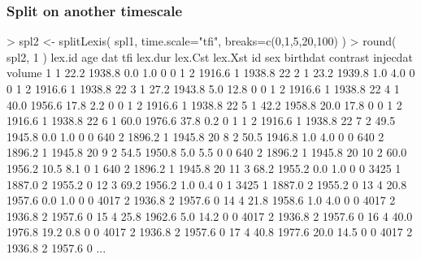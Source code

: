 \begin{frame}[fragile]
  \frametitle{Split on another timescale}
\vspace*{-1em}
\footnotesize
\renewcommand{\baselinestretch}{0.9}
\begin{semiverbatim}
> spl2 <- splitLexis( spl1, time.scale="tfi", breaks=c(0,1,5,20,100) )
> round( spl2, 1 )
   lex.id  age    dat  tfi lex.dur lex.Cst lex.Xst   id sex birthdat contrast injecdat volume
\alert<2>{1       1 22.2 1938.8  0.0     1.0       0       0    1   2   1916.6        1   1938.8     22}
\alert<2,4>{2       1 23.2 1939.8  1.0     4.0       0       0    1   2   1916.6        1   1938.8     22}
\alert<2,4>{3       1 27.2 1943.8  5.0    12.8       0       0    1   2   1916.6        1   1938.8     22}
\alert<2,3>{4       1 40.0 1956.6 17.8     2.2       0       0    1   2   1916.6        1   1938.8     22}
\alert<2,4>{5       1 42.2 1958.8 20.0    17.8       0       0    1   2   1916.6        1   1938.8     22}
\alert<2,3>{6       1 60.0 1976.6 37.8     0.2       0       1    1   2   1916.6        1   1938.8     22}
\alert<5>{7       2 49.5 1945.8  0.0     1.0       0       0  640   2   1896.2        1   1945.8     20}
\alert<5>{8       2 50.5 1946.8  1.0     4.0       0       0  640   2   1896.2        1   1945.8     20}
\alert<5>{9       2 54.5 1950.8  5.0     5.5       0       0  640   2   1896.2        1   1945.8     20}
\alert<5>{10      2 60.0 1956.2 10.5     8.1       0       1  640   2   1896.2        1   1945.8     20}
\alert<6>{11      3 68.2 1955.2  0.0     1.0       0       0 3425   1   1887.0        2   1955.2      0}
\alert<6>{12      3 69.2 1956.2  1.0     0.4       0       1 3425   1   1887.0        2   1955.2      0}
\alert<7>{13      4 20.8 1957.6  0.0     1.0       0       0 4017   2   1936.8        2   1957.6      0}
\alert<7>{14      4 21.8 1958.6  1.0     4.0       0       0 4017   2   1936.8        2   1957.6      0}
\alert<7>{15      4 25.8 1962.6  5.0    14.2       0       0 4017   2   1936.8        2   1957.6      0}
\alert<7>{16      4 40.0 1976.8 19.2     0.8       0       0 4017   2   1936.8        2   1957.6      0}
\alert<7>{17      4 40.8 1977.6 20.0    14.5       0       0 4017   2   1936.8        2   1957.6      0}
...
\end{semiverbatim}
\end{frame}

